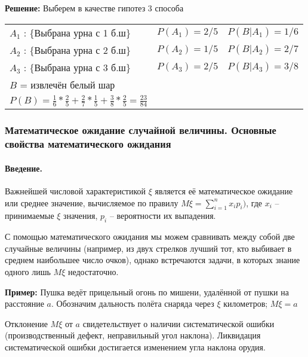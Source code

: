 \documentclass[a4paper,12pt]{report}
\newcommand*{\sample}[1]{\rule{0pt}{10mm}\textbf{#1}}
\newcommand*{\rtask}[1]{\rule{0pt}{10mm}\textbf{#1}}
\begin{document}
	\rtask{Решение:} Выберем в качестве гипотез 3 способа \strut

	\begin{tabular}{ll@{\qquad}l}
	
		$A_1$ : \{Выбрана урна с 1 б.ш\} &  $P(A_1) = 2/5$ & $P(B|A_1) = 1/6$ \\
	
		$A_2$ : \{Выбрана урна с 2 б.ш\} & $P(A_2) = 1/5$ & $P(B|A_2) = 2/7$ \\
	
		$A_3$ : \{Выбрана урна с 3 б.ш\} & $P(A_3) = 2/5$ & $P(B|A_3) = 3/8$ \\
	
		$B$ = {извлечён белый шар} \qquad & & \\
		$P(B) = \frac{1}{6} * \frac{2}{5} + \frac{2}{7} * \frac{1}{5} + \frac{3}{8} * \frac{2}{5} = \frac{23}{84}$
	
	\end{tabular}




\subsubsection{Математическое ожидание случайной величины. Основные свойства математического ожидания}



\paragraph{Введение.}

	Важнейшей числовой характеристикой $\xi$ является её математическое ожидание или среднее значение, вычисляемое по правилу $M\xi = \sum^n_{i=1}x_ip_i)$, где $x_i$ – принимаемые $\xi$ значения, $p_i$ – вероятности их выпадения. 

	С помощью математического ожидания мы можем сравнивать между собой две случайные величины (например, из двух стрелков лучший тот, кто выбивает в среднем наибольшее число очков), однако встречаются задачи, в которых знание одного лишь $M\xi$ недостаточно. 


	\sample{Пример:} Пушка ведёт прицельный огонь по мишени, удалённой от пушки на расстояние $a$. Обозначим дальность полёта снаряда через $\xi$ километров; $M\xi = a$

	Отклонение $M\xi$ от $a$ свидетельствует о наличии систематической ошибки (производственный дефект, неправильный угол наклона). Ликвидация систематической ошибки достигается изменением угла наклона орудия. 
\end{document}
